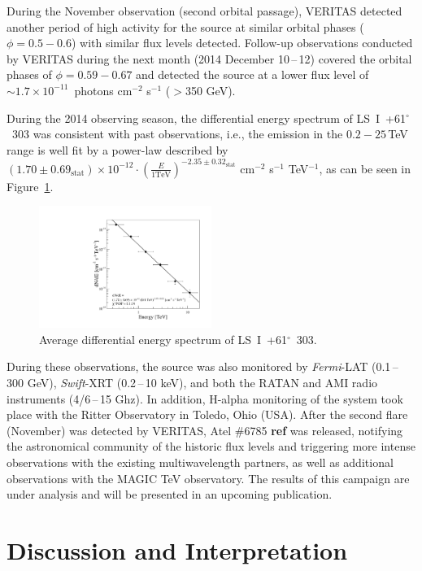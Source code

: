 \documentclass[preprint2]{aastex}
\newcommand{\pflux}{~photons cm$^{-2}$ s$^{-1}$}
\newcommand{\lsi}{LS~I~+61$^{\circ}$~303}
\newcommand{\tev}{\,TeV}
\begin{document}
During the November observation (second orbital passage), VERITAS detected another period of high activity for the source at similar orbital phases ($\phi = 0.5-0.6$) with similar flux levels detected. Follow-up observations conducted by VERITAS during the next month (2014 December 10\,--\,12) covered the orbital phases of $\phi=0.59-0.67$ and detected the source at a lower flux level of $\sim1.7\times10^{-11}$\pflux{} ($>$350 GeV).

During the 2014 observing season, the differential energy spectrum of \lsi{} was consistent with past observations, i.e., the emission in the $0.2-25$\tev{} range is well fit by a power-law described by $\left( 1.70 \pm 0.69_{\mathrm{stat}} \right) \times 10^{-12} \cdot \left( \frac{E}{\mathrm{1 TeV}} \right)^{-2.35 \pm 0.32_{\mathrm{stat}}}$ cm$^{-2}$ s$^{-1}$ TeV$^{-1}$, as can be seen in Figure~\ref{spec}.

\begin{figure}[ht]
\centering
\includegraphics[width=0.5\textwidth]{figs/vegasspec.pdf}
\caption{Average differential energy spectrum of \lsi{}.}
\label{spec}
\end{figure}

During these observations, the source was also monitored by \emph{Fermi}-LAT (0.1\,--\,300 GeV), \emph{Swift}-XRT (0.2\,--\,10 keV), and both the RATAN and AMI radio instruments (4/6\,--\,15 Ghz). In addition, H-alpha monitoring of the system took place with the Ritter Observatory in Toledo, Ohio (USA). After the second flare (November) was detected by VERITAS, Atel $\#$6785 \textbf{ref} was released, notifying the astronomical community of the historic flux levels and triggering more intense observations with the existing multiwavelength partners, as well as additional observations with the MAGIC TeV observatory. The results of this campaign are under analysis and will be presented in an upcoming publication. 

\section{Discussion and Interpretation}
\end{document}
